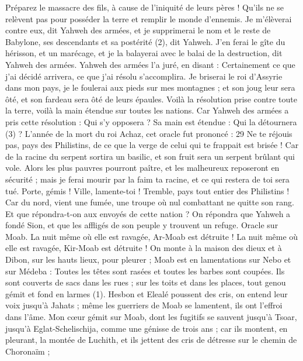 \begin{multicols}{2}
Préparez le massacre des fils, à cause de l'iniquité de leurs pères ! Qu’ils ne se relèvent pas pour posséder la terre et remplir le monde d’ennemis.
Je m'élèverai contre eux, dit Yahweh des armées, et je supprimerai le nom et le reste de Babylone, ses descendants et sa postérité (2), dit Yahweh.
J’en ferai le gîte du hérisson, et un marécage, et je la balayerai avec le balai de la destruction, dit Yahweh des armées.
Yahweh des armées l’a juré, en disant : Certainement ce que j’ai décidé arrivera, ce que j’ai résolu s’accomplira.
Je briserai le roi d'Assyrie dans mon pays, je le foulerai aux pieds sur mes montagnes ; et son joug leur sera ôté, et son fardeau sera ôté de leurs épaules.
Voilà la résolution prise contre toute la terre, voilà la main étendue sur toutes les nations.
Car Yahweh des armées a pris cette résolution : Qui s’y opposera ? Sa main est étendue : Qui la détournera (3) ?
L'année de la mort du roi Achaz, cet oracle fut prononcé : 29 Ne te réjouis pas, pays des Philistins, de ce que la verge de celui qui te frappait est brisée ! Car de la racine du serpent sortira un basilic, et son fruit sera un serpent brûlant qui vole.
Alors les plus pauvres pourront paître, et les malheureux reposeront en sécurité ; mais je ferai mourir par la faim ta racine, et ce qui restera de toi sera tué.
Porte, gémis ! Ville, lamente-toi ! Tremble, pays tout entier des Philistins ! Car du nord, vient une fumée, une troupe où nul combattant ne quitte son rang.
Et que répondra-t-on aux envoyés de cette nation ? On répondra que Yahweh a fondé Sion, et que les affligés de son peuple y trouvent un refuge.
\VerseOne{}Oracle sur Moab. La nuit même où elle est ravagée, Ar-Moab est détruite ! La nuit même où elle est ravagée, Kir-Moab est détruite !
On monte à la maison des dieux et à Dibon, sur les hauts lieux, pour pleurer ; Moab est en lamentations sur Nebo et sur Médeba : Toutes les têtes sont rasées et toutes les barbes sont coupées.
Ils sont couverts de sacs dans les rues ; sur les toits et dans les places, tout genou gémit et fond en larmes (1).
Hesbon et Elealé poussent des cris, on entend leur voix jusqu’à Jahats ; même les guerriers de Moab se lamentent, ils ont l’effroi dans l’âme.
Mon cœur gémit sur Moab, dont les fugitifs se sauvent jusqu’à Tsoar, jusqu’à Eglat-Schelischija, comme une génisse de trois ans ; car ils montent, en pleurant, la montée de Luchith, et ils jettent des cris de détresse sur le chemin de Choronaïm ;

\end{multicols}
